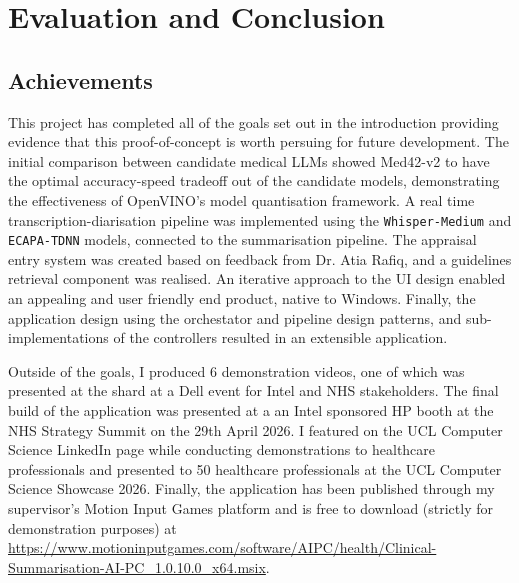 \chapter{Evaluation and Conclusion}
\section{Achievements}
This project has completed all of the goals set out in the introduction providing evidence that this proof-of-concept is worth persuing for future development. The initial comparison between candidate medical LLMs showed Med42-v2 to have the optimal accuracy-speed tradeoff out of the candidate models, demonstrating the effectiveness of OpenVINO's model quantisation framework. A real time transcription-diarisation pipeline was implemented using the \texttt{Whisper-Medium} and \texttt{ECAPA-TDNN} models, connected to the summarisation pipeline. The appraisal entry system was created based on feedback from Dr. Atia Rafiq, and a guidelines retrieval component was realised. An iterative approach to the UI design enabled an appealing and user friendly end product, native to Windows. Finally, the application design using the orchestator and pipeline design patterns, and sub-implementations of the controllers resulted in an extensible application. 

Outside of the goals, I produced 6 demonstration videos, one of which was presented at the shard at a Dell event for Intel and NHS stakeholders. The final build of the application was presented at a an Intel sponsored HP booth at the NHS Strategy Summit on the 29th April 2026. I featured on the UCL Computer Science LinkedIn page while conducting demonstrations to healthcare professionals and presented to 50 healthcare professionals at the UCL Computer Science Showcase 2026. Finally, the application has been published through my supervisor's Motion Input Games platform and is free to download (strictly for demonstration purposes) at \url{https://www.motioninputgames.com/software/AIPC/health/Clinical-Summarisation-AI-PC_1.0.10.0_x64.msix}.


